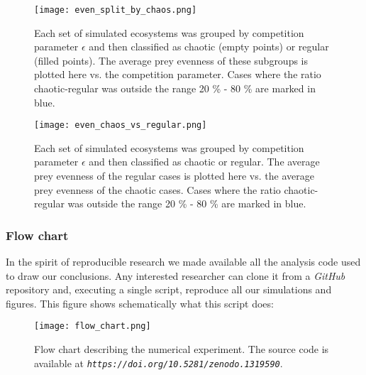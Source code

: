 \begin{figure}[H]
	\begin{center}
		\texttt{[image: even\_split\_by\_chaos.png]}
	\end{center}
	\caption{Each set of simulated ecosystems was grouped by competition parameter $\epsilon$ and then classified as chaotic (empty points) or regular (filled points). The average prey evenness of these subgroups is plotted here vs. the competition parameter. Cases where the ratio chaotic-regular was outside the range 20 \% - 80 \% are marked in blue.}
	\label{fig:EvenSplitByChaos}
\end{figure}

\begin{figure}[H]
	\begin{center}
		\texttt{[image: even\_chaos\_vs\_regular.png]}
	\end{center}
	\caption{Each set of simulated ecosystems was grouped by competition parameter $\epsilon$ and then classified as chaotic or regular. The average prey evenness of the regular cases is plotted here vs. the average prey evenness of the chaotic cases. Cases where the ratio chaotic-regular was outside the range 20 \% - 80 \% are marked in blue.}
	\label{fig:EvenChaosVsRegular}
\end{figure}

\subsubsection{Flow chart}
\label{subsubsec:FlowChart}
In the spirit of reproducible research we made available all the analysis code used to draw our conclusions. Any interested researcher can clone it from a \textit{GitHub} repository \citep{Rodriguez-Sanchez-code-neuchaos} and, executing a single script, reproduce all our simulations and figures. This figure shows schematically what this script does:

\begin{figure}[H]
	\begin{center}
		\texttt{[image: flow\_chart.png]}
	\end{center}
	\caption{Flow chart describing the numerical experiment. The source code is available at \textit{\texttt{https://doi.org/10.5281/zenodo.1319590}}.}
	\label{fig:FlowChart}
\end{figure}
